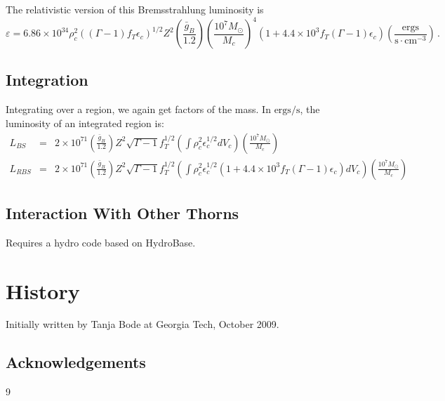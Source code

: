 The relativistic version of this Bremsstrahlung luminosity is
\begin{equation}
  \varepsilon = 6.86\times10^{34} \rho_c^2 \left( (\Gamma-1) f_T \epsilon_c \right)^{1/2}  Z^2 \left( \frac{\bar{g}_B}{1.2} \right) 
	\left( \frac{10^7 M_\odot}{M_c} \right)^4 \left( 1 + 4.4\times 10^3 f_T (\Gamma-1) \epsilon_c  \right)
	\left(\mathrm{\frac{ergs}{s\cdot cm^{-3}}} \right)\,.
\end{equation}

\subsection{Integration}

Integrating over a region, we again get factors of the mass.  In $\mathrm{ergs/s}$, the luminosity of an integrated region is:
\begin{eqnarray}
  L_{BS} &=& 2\times10^{71} \left( \frac{\bar{g}_B}{1.2} \right) Z^2 \sqrt{\Gamma-1} f_T^{1/2} \left( \int \rho_c^2 \epsilon_c^{1/2} dV_c \right) \left( \frac{10^7 M_\odot}{M_c}\right ) \\
  L_{RBS} &=& 2\times10^{71} \left( \frac{\bar{g}_B}{1.2} \right) Z^2 \sqrt{\Gamma-1} f_T^{1/2} \left( \int \rho_c^2 \epsilon_c^{1/2} (1+4.4\times10^3 f_T (\Gamma-1) \epsilon_c) dV_c \right) \left( \frac{10^7 M_\odot}{M_c}\right)
\end{eqnarray}


\subsection{Interaction With Other Thorns}

Requires a hydro code based on HydroBase.

\section{History}

Initially written by Tanja Bode at Georgia Tech, October 2009.

\subsection{Acknowledgements}


\begin{thebibliography}{9}

\end{thebibliography}




